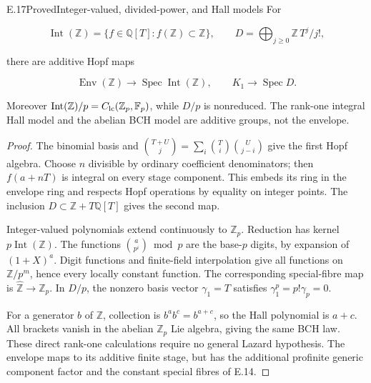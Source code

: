 \begin{statement}{E.17}{Proved}{Integer-valued, divided-power, and Hall models}
For

$$
\operatorname{Int}(\mathbb Z)=
 \{f\in\mathbb Q[T]:f(\mathbb Z)\subset\mathbb Z\},\qquad
 D=\bigoplus_{j\ge0}\mathbb Z\,T^j/j!,
$$

there are additive Hopf maps

$$
\operatorname{Env}(\mathbb Z)\to
 \operatorname{Spec}\operatorname{Int}(\mathbb Z),\qquad
 K_1\to\operatorname{Spec}D.
$$

Moreover $\operatorname{Int}(\mathbb Z)/p
=C_{\rm lc}(\mathbb Z_p,\mathbb F_p)$, while $D/p$
is nonreduced. The rank-one integral Hall model and
the abelian BCH model are additive groups, not the envelope.
\end{statement}
\begin{proof}
The binomial basis and
$\binom{T+U}{j}=\sum_i\binom Ti\binom U{j-i}$
give the first Hopf algebra.
Choose $n$ divisible by ordinary coefficient denominators;
then $f(a+nT)$ is integral on every stage component.
This embeds its ring in the envelope ring and respects
Hopf operations by equality on integer points.
The inclusion $D\subset\mathbb Z+T\mathbb Q[T]$ gives
the second map.

Integer-valued polynomials extend continuously to
$\mathbb Z_p$. Reduction has kernel $p\operatorname{Int}(\mathbb Z)$.
The functions $\binom a{p^i}\bmod p$ are the base-$p$
digits, by expansion of $(1+X)^a$.
Digit functions and finite-field interpolation give
all functions on $\mathbb Z/p^m$, hence every locally
constant function. The corresponding special-fibre
map is $\widehat{\mathbb Z}\to\mathbb Z_p$.
In $D/p$, the nonzero basis vector $\gamma_1=T$ satisfies
$\gamma_1^p=p!\gamma_p=0$.

For a generator $b$ of $\mathbb Z$, collection is
$b^ab^c=b^{a+c}$, so the Hall polynomial is $a+c$.
All brackets vanish in the abelian $\mathbb Z_p$ Lie
algebra, giving the same BCH law. These direct rank-one
calculations require no general Lazard hypothesis.
The envelope maps to its additive finite stage, but
has the additional profinite generic component factor
and the constant special fibres of E.14.
\end{proof}

